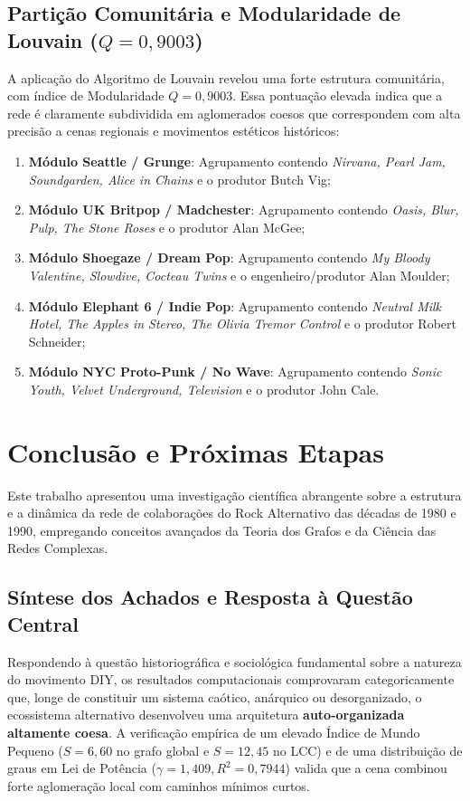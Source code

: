 \documentclass[conference]{IEEEtran}
\begin{document}
\subsection{Partição Comunitária e Modularidade de Louvain ($Q = 0,9003$)}
A aplicação do Algoritmo de Louvain revelou uma forte estrutura comunitária, com índice de Modularidade $Q = 0,9003$. Essa pontuação elevada indica que a rede é claramente subdividida em aglomerados coesos que correspondem com alta precisão a cenas regionais e movimentos estéticos históricos:
\begin{enumerate}
    \item \textbf{Módulo Seattle / Grunge}: Agrupamento contendo \textit{Nirvana, Pearl Jam, Soundgarden, Alice in Chains} e o produtor Butch Vig;
    \item \textbf{Módulo UK Britpop / Madchester}: Agrupamento contendo \textit{Oasis, Blur, Pulp, The Stone Roses} e o produtor Alan McGee;
    \item \textbf{Módulo Shoegaze / Dream Pop}: Agrupamento contendo \textit{My Bloody Valentine, Slowdive, Cocteau Twins} e o engenheiro/produtor Alan Moulder;
    \item \textbf{Módulo Elephant 6 / Indie Pop}: Agrupamento contendo \textit{Neutral Milk Hotel, The Apples in Stereo, The Olivia Tremor Control} e o produtor Robert Schneider;
    \item \textbf{Módulo NYC Proto-Punk / No Wave}: Agrupamento contendo \textit{Sonic Youth, Velvet Underground, Television} e o produtor John Cale.
\end{enumerate}

\section{Conclusão e Próximas Etapas}

Este trabalho apresentou uma investigação científica abrangente sobre a estrutura e a dinâmica da rede de colaborações do Rock Alternativo das décadas de 1980 e 1990, empregando conceitos avançados da Teoria dos Grafos e da Ciência das Redes Complexas.

\subsection{Síntese dos Achados e Resposta à Questão Central}
Respondendo à questão historiográfica e sociológica fundamental sobre a natureza do movimento DIY, os resultados computacionais comprovaram categoricamente que, longe de constituir um sistema caótico, anárquico ou desorganizado, o ecossistema alternativo desenvolveu uma arquitetura \textbf{auto-organizada altamente coesa}. A verificação empírica de um elevado Índice de Mundo Pequeno ($S = 6,60$ no grafo global e $S = 12,45$ no LCC) e de uma distribuição de graus em Lei de Potência ($\gamma = 1,409, R^2 = 0,7944$) valida que a cena combinou forte aglomeração local com caminhos mínimos curtos.
\end{document}
